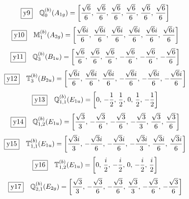 \documentclass[fleqn,10pt,landscape]{jsarticle}
\begin{document}
\begin{dmath*}
\fbox{y9}\quad \mathbb{Q}_{0}^{(b)}(A_{1g})=\left[ \frac{\sqrt{6}}{6},\, \frac{\sqrt{6}}{6},\, \frac{\sqrt{6}}{6},\, \frac{\sqrt{6}}{6},\, \frac{\sqrt{6}}{6},\, \frac{\sqrt{6}}{6} \right]
\end{dmath*}
\begin{dmath*}
\fbox{y10}\quad \mathbb{M}_{1}^{(b)}(A_{2g})=\left[ \frac{\sqrt{6} i}{6},\, \frac{\sqrt{6} i}{6},\, \frac{\sqrt{6} i}{6},\, \frac{\sqrt{6} i}{6},\, \frac{\sqrt{6} i}{6},\, \frac{\sqrt{6} i}{6} \right]
\end{dmath*}
\begin{dmath*}
\fbox{y11}\quad \mathbb{Q}_{3}^{(b)}(B_{1u})=\left[ \frac{\sqrt{6}}{6},\, \frac{\sqrt{6}}{6},\, \frac{\sqrt{6}}{6},\, - \frac{\sqrt{6}}{6},\, - \frac{\sqrt{6}}{6},\, - \frac{\sqrt{6}}{6} \right]
\end{dmath*}
\begin{dmath*}
\fbox{y12}\quad \mathbb{T}_{3}^{(b)}(B_{2u})=\left[ \frac{\sqrt{6} i}{6},\, \frac{\sqrt{6} i}{6},\, \frac{\sqrt{6} i}{6},\, - \frac{\sqrt{6} i}{6},\, - \frac{\sqrt{6} i}{6},\, - \frac{\sqrt{6} i}{6} \right]
\end{dmath*}
\begin{dmath*}
\fbox{y13}\quad \mathbb{Q}_{1,1}^{(b)}(E_{1u})=\left[ 0,\, - \frac{1}{2},\, \frac{1}{2},\, 0,\, \frac{1}{2},\, - \frac{1}{2} \right]
\end{dmath*}
\begin{dmath*}
\fbox{y14}\quad \mathbb{Q}_{1,2}^{(b)}(E_{1u})=\left[ \frac{\sqrt{3}}{3},\, - \frac{\sqrt{3}}{6},\, - \frac{\sqrt{3}}{6},\, - \frac{\sqrt{3}}{3},\, \frac{\sqrt{3}}{6},\, \frac{\sqrt{3}}{6} \right]
\end{dmath*}
\begin{dmath*}
\fbox{y15}\quad \mathbb{T}_{1,1}^{(b)}(E_{1u})=\left[ \frac{\sqrt{3} i}{3},\, - \frac{\sqrt{3} i}{6},\, - \frac{\sqrt{3} i}{6},\, - \frac{\sqrt{3} i}{3},\, \frac{\sqrt{3} i}{6},\, \frac{\sqrt{3} i}{6} \right]
\end{dmath*}
\begin{dmath*}
\fbox{y16}\quad \mathbb{T}_{1,2}^{(b)}(E_{1u})=\left[ 0,\, \frac{i}{2},\, - \frac{i}{2},\, 0,\, - \frac{i}{2},\, \frac{i}{2} \right]
\end{dmath*}
\begin{dmath*}
\fbox{y17}\quad \mathbb{Q}_{2,1}^{(b)}(E_{2g})=\left[ \frac{\sqrt{3}}{3},\, - \frac{\sqrt{3}}{6},\, - \frac{\sqrt{3}}{6},\, \frac{\sqrt{3}}{3},\, - \frac{\sqrt{3}}{6},\, - \frac{\sqrt{3}}{6} \right]
\end{dmath*}
\end{document}
